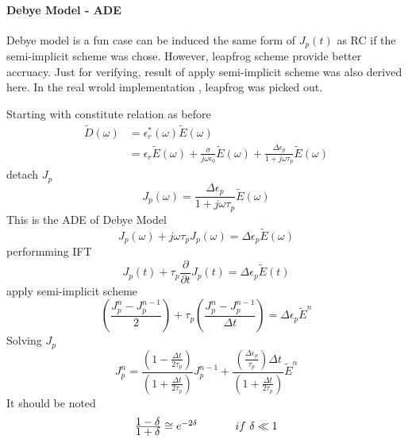 \paragraph{{\msjh Debye Model - ADE}}
Debye model is a fun case can be induced the same form of $J_p(t)$ as RC if the semi-implicit scheme was chose. However,
leapfrog scheme provide better accruacy. Just for verifying, result of apply semi-implicit scheme was also derived
here. In the real wrold implementation \textit{}, leapfrog was picked out.

Starting with constitute relation as before
\begin{equation}
  \begin{split}
    \widetilde{D}(\omega) & = \epsilon_r^*(\omega)\widetilde{E}(\omega)\\
    & = \epsilon_r\widetilde{E}(\omega) + \frac{\sigma}{j\omega\epsilon_0}\widetilde{E}(\omega) + \frac{\Delta \epsilon_p}{1+j\omega \tau_p}\widetilde{E}(\omega)\label{eq:debye_ade_start}
  \end{split}
\end{equation}
detach $J_p$
\begin{equation}
  J_p(\omega) = \frac{\Delta \epsilon_p}{1+j\omega \tau_p}\widetilde{E}(\omega)
\end{equation}
This is the ADE of Debye Model
\begin{equation}
  J_p(\omega) + j\omega\tau_{p}J_p(\omega) = \Delta\epsilon_p\widetilde{E}(\omega)
\end{equation}
performming IFT 
\begin{equation}
  J_p(t) + \tau_p\frac{\partial}{\partial t}J_p(t) = \Delta\epsilon_p\widetilde{E}(t)
\end{equation}
apply semi-implicit scheme
\begin{equation}
  \left( \frac{J_p^n - J_p^{n-1}}{2} \right) + \tau_p \left( \frac{J_p^n - J_p^{n-1}}{\Delta t}\right) = \Delta\epsilon_p\widetilde{E}^n
\end{equation}
Solving $J_p$
\begin{equation}
  J_p^n = \frac{\left(1-\frac{\Delta t}{2\tau_p}\right)}{\left(1+\frac{\Delta t}{2\tau_p}\right)}J_p^{n-1} 
  + \frac{\left(\frac{\Delta\epsilon_p}{\tau_p}\right)\Delta t}{\left(1+\frac{\Delta t}{2\tau_p}\right)}\widetilde{E}^n
\end{equation}
It should be noted
\begin{equation}
  \begin{array}{@{}lp{0.5cm}r@{}}
    \frac{\displaystyle1-\delta}{\displaystyle1+\delta} \cong e^{-2\delta} && if\ \delta \ll 1
  \end{array}
\end{equation}
